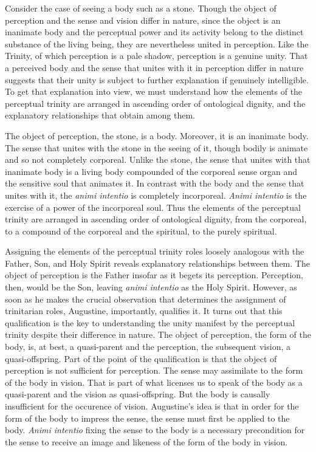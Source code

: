 \documentclass[12pt]{article}
\begin{document}
Consider the case of seeing a body such as a stone. Though the object of perception and the sense and vision differ in nature, since the object is an inanimate body and the perceptual power and its activity belong to the distinct substance of the living being, they are nevertheless united in perception. Like the Trinity, of which perception is a pale shadow, perception is a genuine unity. That a perceived body and the sense that unites with it in perception differ in nature suggests that their unity is subject to further explanation if genuinely intelligible. To get that explanation into view, we must understand how the elements of the perceptual trinity are arranged in ascending order of ontological dignity, and the explanatory relationships that obtain among them.

The object of perception, the stone, is a body. Moreover, it is an inanimate body. The sense that unites with the stone in the seeing of it, though bodily is animate and so not completely corporeal. Unlike the stone, the sense that unites with that inanimate body is a living body compounded of the corporeal sense organ and the sensitive soul that animates it. In contrast with the body and the sense that unites with it, the \emph{animi intentio} is completely incorporeal. \emph{Animi intentio} is the exercise of a power of the incorporeal soul. Thus the elements of the perceptual trinity are arranged in ascending order of ontological dignity, from the corporeal, to a compound of the corporeal and the spiritual, to the purely spiritual.

Assigning the elements of the perceptual trinity roles loosely analogous with the Father, Son, and Holy Spirit reveals explanatory relationships between them. The object of perception is the Father insofar as it begets its perception. Perception, then, would be the Son, leaving \emph{animi intentio} as the Holy Spirit. However, as soon as he makes the crucial observation that determines the assignment of trinitarian roles, Augustine, importantly, qualifies it. It turns out that this qualification is the key to understanding the unity manifest by the perceptual trinity despite their difference in nature. The object of perception, the form of the body, is, at best, a quasi-parent and the perception, the subsequent vision, a quasi-offspring. Part of the point of the qualification is that the object of perception is not sufficient for perception. The sense may assimilate to the form of the body in vision. That is part of what licenses us to speak of the body as a quasi-parent and the vision as quasi-offspring. But the body is causally insufficient for the occurence of vision. Augustine's idea is that in order for the form of the body to impress the sense, the sense must first be applied to the body. \emph{Animi intentio} fixing the sense to the body is a necessary precondition for the sense to receive an image and likeness of the form of the body in vision. 
\end{document}
